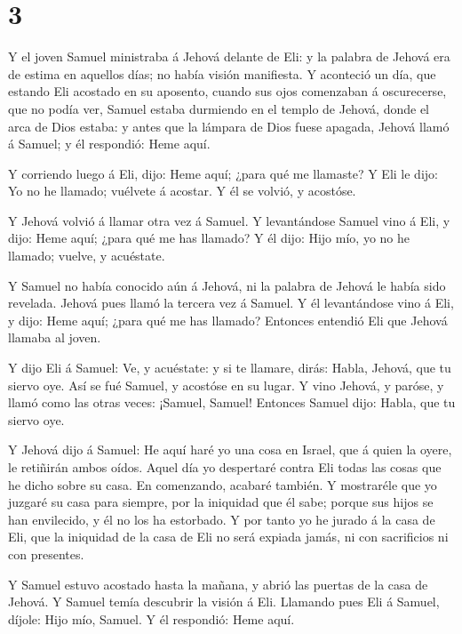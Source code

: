 \hypertarget{section-2}{%
\section{3}\label{section-2}}

 Y el joven Samuel ministraba á Jehová delante de Eli: y la
palabra de Jehová era de estima en aquellos días; no había visión
manifiesta.  Y aconteció un día, que estando Eli acostado en
su aposento, cuando sus ojos comenzaban á oscurecerse, que no podía ver,
 Samuel estaba durmiendo en el templo de Jehová, donde el
arca de Dios estaba: y antes que la lámpara de Dios fuese apagada,
 Jehová llamó á Samuel; y él respondió: Heme aquí.

 Y corriendo luego á Eli, dijo: Heme aquí; ¿para qué me
llamaste? Y Eli le dijo: Yo no he llamado; vuélvete á acostar. Y él se
volvió, y acostóse.

 Y Jehová volvió á llamar otra vez á Samuel. Y levantándose
Samuel vino á Eli, y dijo: Heme aquí; ¿para qué me has llamado? Y él
dijo: Hijo mío, yo no he llamado; vuelve, y acuéstate.

 Y Samuel no había conocido aún á Jehová, ni la palabra de
Jehová le había sido revelada.  Jehová pues llamó la tercera
vez á Samuel. Y él levantándose vino á Eli, y dijo: Heme aquí; ¿para qué
me has llamado? Entonces entendió Eli que Jehová llamaba al joven.

 Y dijo Eli á Samuel: Ve, y acuéstate: y si te llamare,
dirás: Habla, Jehová, que tu siervo oye. Así se fué Samuel, y acostóse
en su lugar.  Y vino Jehová, y paróse, y llamó como las
otras veces: ¡Samuel, Samuel! Entonces Samuel dijo: Habla, que tu siervo
oye.

 Y Jehová dijo á Samuel: He aquí haré yo una cosa en
Israel, que á quien la oyere, le retiñirán ambos oídos. 
Aquel día yo despertaré contra Eli todas las cosas que he dicho sobre su
casa. En comenzando, acabaré también.  Y mostraréle que yo
juzgaré su casa para siempre, por la iniquidad que él sabe; porque sus
hijos se han envilecido, y él no los ha estorbado.  Y por
tanto yo he jurado á la casa de Eli, que la iniquidad de la casa de Eli
no será expiada jamás, ni con sacrificios ni con presentes.

 Y Samuel estuvo acostado hasta la mañana, y abrió las
puertas de la casa de Jehová. Y Samuel temía descubrir la visión á Eli.
 Llamando pues Eli á Samuel, díjole: Hijo mío, Samuel. Y él
respondió: Heme aquí.

